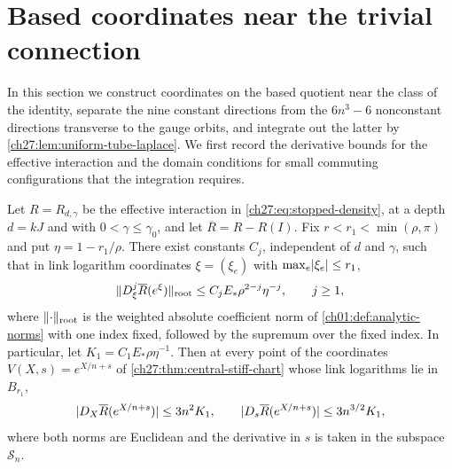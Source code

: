 \section{Based coordinates near the trivial connection}\label{ch27:sec:central}

In this section we construct coordinates on the based quotient near the class of the identity, separate the nine constant directions from the $6n^3-6$ nonconstant directions transverse to the gauge orbits, and integrate out the latter by \cref{ch27:lem:uniform-tube-laplace}. We first record the derivative bounds for the effective interaction and the domain conditions for small commuting configurations that the integration requires.

\begin{lemma}\label{ch27:lem:residual-derivatives}
Let $R=R_{d,\gamma}$ be the effective interaction in \eqref{ch27:eq:stopped-density}, at a depth $d=kJ$ and with $0<\gamma\le\gamma_0$, and let $\overline R=R-R(I)$. Fix $r<r_1<\min(\rho,\pi)$ and put $\eta=1-r_1/\rho$. There exist constants $C_j$, independent of $d$ and $\gamma$, such that in link logarithm coordinates $\xi=(\xi_e)$ with $\max_e\lvert \xi_e\rvert\le r_1$,
\begin{equation}\label{ch27:eq:residual-interior-derivatives}
 \lVert D_\xi^j\overline R(e^\xi)\rVert_{\mathrm{root}}\le C_jE_*\rho^{2-j}\eta^{-j},\qquad j\ge1,
\end{equation}
where $\lVert \cdot\rVert_{\mathrm{root}}$ is the weighted absolute coefficient norm of \cref{ch01:def:analytic-norms} with one index fixed, followed by the supremum over the fixed index. In particular, let $K_1=C_1E_*\rho\eta^{-1}$. Then at every point of the coordinates $V(X,s)=e^{X/n+s}$ of \cref{ch27:thm:central-stiff-chart} whose link logarithms lie in $B_{r_1}$,
\begin{equation}\label{ch27:eq:residual-central-derivatives}
 \lvert D_X\overline R(e^{X/n+s})\rvert\le3n^2K_1,\qquad\lvert D_s\overline R(e^{X/n+s})\rvert\le3n^{3/2}K_1,
\end{equation}
where both norms are Euclidean and the derivative in $s$ is taken in the subspace $\mathcal S_n$.


\end{lemma}
